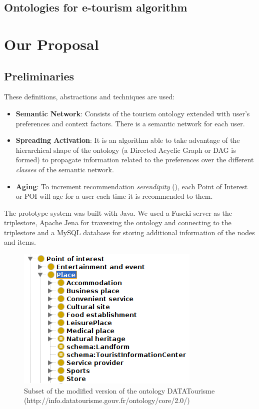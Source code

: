 \documentclass{article}
\begin{document}
\subsection{Ontologies for e-tourism algorithm}

\section{Our Proposal}

\subsection{Preliminaries}
These definitions, abstractions and techniques are used:
\begin{itemize}
\item \textbf{Semantic Network}: Consists of the tourism ontology extended with user's preferences and context factors. There is a semantic network for each user.
\item \textbf{Spreading Activation}: It is an algorithm able to take advantage of the hierarchical shape of the ontology (a Directed Acyclic Graph or DAG is formed) to propagate information related to the preferences over the different \textit{classes} of the semantic network.
\item \textbf{Aging}: To increment recommendation \textit{serendipity} (\cite{kotkov2016survey}), each Point of Interest or POI will age for a user each time it is recommended to them.
\end{itemize}
The prototype system was built with Java. We used a Fuseki server as the triplestore, Apache Jena for traversing the ontology and connecting to the triplestore and a MySQL database for storing additional information of the nodes and items.

\begin{figure}[h]
\centering
\includegraphics[scale=0.75]{ontology.png}
\caption{Subset of the modified version of the ontology DATATourisme (http://info.datatourisme.gouv.fr/ontology/core/2.0/)}
\label{fig:ontology}
\end{figure}
\end{document}
